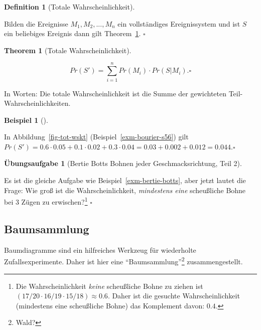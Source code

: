 \documentclass[
  ngerman,
  letterpaper,
  twoside,
  open=any]{scrbook}
\theoremstyle{definition}
\newtheorem{example}{Beispiel}[chapter]
\theoremstyle{plain}
\newtheorem{theorem}{Theorem}[chapter]
\theoremstyle{definition}
\newtheorem{exercise}{Übungsaufgabe}[chapter]
\theoremstyle{definition}
\newtheorem{definition}{Definition}[chapter]
\theoremstyle{definition}
\newtheorem{example}{Beispiel}[chapter]
\theoremstyle{definition}
\newtheorem{exercise}{Übungsaufgabe}[chapter]
\theoremstyle{remark}
\begin{document}
\begin{definition}[Totale
Wahrscheinlichkeit]\protect\hypertarget{def-totwskt}{}\label{def-totwskt}

Bilden die Ereignisse \(M_1, M_2, ..., M_n\) ein vollständiges
Ereignissystem und ist \(S\) ein beliebiges Ereignis dann gilt
Theorem~\ref{thm-totale-wskt}. \(\square\)

\end{definition}

\begin{theorem}[Totale
Wahrscheinlichkeit]\protect\hypertarget{thm-totale-wskt}{}\label{thm-totale-wskt}

\[Pr(S') = \sum_{i=1}^n Pr(M_i) \cdot Pr(S|M_i).\square\]

\end{theorem}

In Worten: Die totale Wahrscheinlichkeit ist die Summe der gewichteten
Teil-Wahrscheinlichkeiten.

\begin{example}[]\protect\hypertarget{exm-totwskt1}{}\label{exm-totwskt1}

In Abbildung~\ref{fig-tot-wskt} (Beispiel~\ref{exm-bourier-s56}) gilt
\(Pr(S') = 0.6 \cdot 0.05 + 0.1 \cdot 0.02 + 0.3 \cdot 0.04 = 0.03 + 0.002 + 0.012 = 0.044.\square\)

\end{example}

\begin{exercise}[Bertie Botts Bohnen jeder Geschmacksrichtung, Teil
2]\protect\hypertarget{exr-bertie-botts2}{}\label{exr-bertie-botts2}

Es ist die gleiche Aufgabe wie Beispiel~\ref{exm-bertie-botts}, aber
jetzt lautet die Frage: Wie groß ist die Wahrscheinlichkeit,
\emph{mindestens eine} scheußliche Bohne bei 3 Zügen zu
erwischen?\footnote{Die Wahrscheinlichkeit \emph{keine} scheußliche
  Bohne zu ziehen ist \((17/20 \cdot 16/19 \cdot 15/18) \approx 0.6\).
  Daher ist die gesuchte Wahrscheinlichkeit (mindestens eine scheußliche
  Bohne) das Komplement davon: \(0.4\).} \(\square\)

\end{exercise}

\subsection{Baumsammlung}\label{baumsammlung}

Baumdiagramme sind ein hilfreiches Werkzeug für wiederholte
Zufallsexperimente. Daher ist hier eine
\enquote{Baumsammlung}\footnote{Wald?} zusammengestellt.
\end{document}
